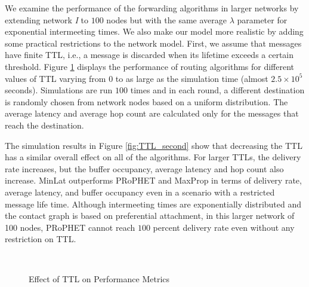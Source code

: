 \documentclass[journal,onecolumn,11pt]{IEEEtran}
\theoremstyle{plain}
\theoremstyle{definition}
\begin{document}
We examine the performance of the forwarding algorithms in larger
networks by extending network {\em I} to $100$ nodes but with the same
average $\lambda$ parameter for exponential intermeeting times. We
also make our model more realistic by adding some practical
restrictions to the network model. First, we assume that messages have
finite TTL, i.e., a message is discarded when its lifetime exceeds a
certain threshold. Figure \ref{fig:res_TTL} displays the performance
of routing algorithms for different values of TTL varying from $0$ to
as large as the simulation time (almost $2.5 \times
10^5$seconds). Simulations are run $100$ times and in each round, a
different destination is randomly chosen from network nodes based on a
uniform distribution.  The average latency and average hop count are
calculated only for the messages that reach the
destination. 

The simulation results in Figure \ref{fig:TTL_second} show that
decreasing the TTL has a similar overall effect on all of the
algorithms. For larger TTLs, the delivery rate increases, but the
buffer occupancy, average latency and hop count also increase. MinLat
outperforms PRoPHET and MaxProp in terms of delivery rate, average
latency, and buffer occupancy even in a scenario with a restricted
message life time.  Although intermeeting times are exponentially distributed and the
contact graph is based on preferential attachment, in this larger
network of 100 nodes, PRoPHET cannot reach $100$ percent delivery rate
even without any restriction on TTL.

\begin{figure}[!hbt]
\centering
\hspace*{0.02in} \hspace*{0in}
\\

\hspace*{0in}
\caption{Effect of TTL on Performance Metrics}
\label{fig:res_TTL}
\end{figure}
\end{document}

